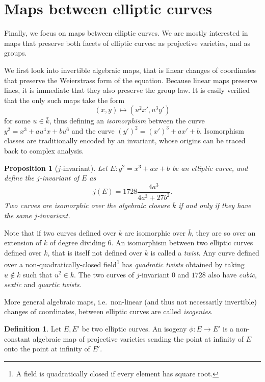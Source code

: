 \documentclass[10pt]{article}
\theoremstyle{plain}
\newtheorem{proposition}[theorem]{Proposition}
\theoremstyle{definition}
\newtheorem{definition}[theorem]{Definition}
\begin{document}
\section{Maps between elliptic curves}

Finally, we focus on maps between elliptic curves. %
We are mostly interested in maps that preserve both facets of elliptic
curves: as projective varieties, and as groups. %

We first look into invertible algebraic maps, that is linear changes
of coordinates that preserve the Weierstrass form of the equation. %
Because linear maps preserve lines, it is immediate that they also
preserve the group law. %
It is easily verified that the only such maps take the form
\[(x,y) \mapsto (u^2x', u^3y')\] %
for some $u∈\bar{k}$, thus defining an \emph{isomorphism} between the
curve $y^2=x^3+au^4x+bu^6$ and the curve $(y')^2 = (x')^3 + ax' +
b$. %
Isomorphism classes are traditionally encoded by an invariant, whose
origins can be traced back to complex analysis.

\begin{proposition}[$j$-invariant]
  \label{th:j}
  Let $E:y^2=x^3+ax+b$ be an elliptic curve, and define the
  \emph{$j$-invariant} of $E$ as
  \[j(E) = 1728\frac{4a^3}{4a^3+27b^2}.\] %
  Two curves are isomorphic over the algebraic closure $\bar{k}$ if
  and only if they have the same $j$-invariant.
\end{proposition}

Note that if two curves defined over $k$ are isomorphic over
$\bar{k}$, they are so over an extension of $k$ of degree dividing
$6$. %
An isomorphism between two elliptic curves defined over $k$, that is
itself not defined over $k$ is called a \emph{twist}. %
Any curve defined over a non-quadratically-closed field\footnote{A
  field is quadratically closed if every element has square root.} has
\emph{quadratic twists} obtained by taking $u∉k$ such that $u^2∈k$. %
The two curves of $j$-invariant $0$ and $1728$ also have \emph{cubic},
\emph{sextic} and \emph{quartic twists}.

More general algebraic maps, i.e.\ non-linear (and thus not
necessarily invertible) changes of coordinates, between elliptic
curves are called \emph{isogenies}.

\begin{definition}
  Let $E,E'$ be two elliptic curves. %
  An isogeny $\phi:E→E'$ is a non-constant algebraic map of projective
  varieties sending the point at infinity of $E$ onto the point at
  infinity of $E'$.
\end{definition}
\end{document}
